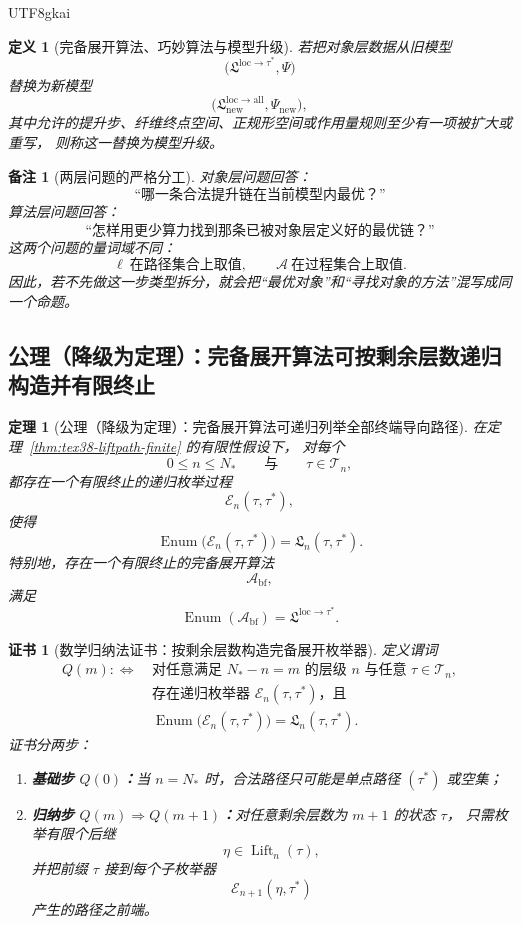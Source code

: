 \documentclass[12pt]{article}
\newtheorem{definition}{定义}[section]
\newtheorem{theorem}{定理}[section]
\newtheorem{remark}{备注}[section]
\newtheorem{Certificate}{证书}[section]
\newcommand{\Lift}{\operatorname{Lift}}
\begin{document}
\begin{CJK*}{UTF8}{gkai}
\begin{definition}[完备展开算法、巧妙算法与模型升级]
若把对象层数据从旧模型
\[
  \bigl(\mathfrak L^{\mathrm{loc}\to\tau^\ast},\Psi\bigr)
\]
替换为新模型
\[
  \bigl(\mathfrak L_{\mathrm{new}}^{\mathrm{loc}\to\mathrm{all}},\Psi_{\mathrm{new}}\bigr),
\]
其中允许的提升步、纤维终点空间、正规形空间或作用量规则至少有一项被扩大或重写，
则称这一替换为\emph{模型升级}。
\end{definition}

\begin{remark}[两层问题的严格分工]
对象层问题回答：
\[
  \text{“哪一条合法提升链在当前模型内最优？”}
\]
算法层问题回答：
\[
  \text{“怎样用更少算力找到那条已被对象层定义好的最优链？”}
\]
这两个问题的量词域不同：
\[
  \ell\ \text{在路径集合上取值},
  \qquad
  \mathcal A\ \text{在过程集合上取值}.
\]
因此，若不先做这一步类型拆分，就会把“最优对象”和“寻找对象的方法”混写成同一个命题。
\end{remark}

\subsection{公理（降级为定理）：完备展开算法可按剩余层数递归构造并有限终止}
\label{subsec:tex38-smart-enumeration}

\begin{theorem}[公理（降级为定理）：完备展开算法可递归列举全部终端导向路径]
\label{thm:tex38-smart-enumeration}
在定理~\ref{thm:tex38-liftpath-finite} 的有限性假设下，
对每个
\[
  0\le n\le N_\ast
  \qquad\text{与}\qquad
  \tau\in\mathcal T_n,
\]
都存在一个有限终止的递归枚举过程
\[
  \mathcal E_n(\tau,\tau^\ast),
\]
使得
\[
  \operatorname{Enum}\bigl(\mathcal E_n(\tau,\tau^\ast)\bigr)
  =
  \mathfrak L_n(\tau,\tau^\ast).
\]
特别地，存在一个有限终止的完备展开算法
\[
  \mathcal A_{\mathrm{bf}},
\]
满足
\[
  \operatorname{Enum}(\mathcal A_{\mathrm{bf}})
  =
  \mathfrak L^{\mathrm{loc}\to\tau^\ast}.
\]
\end{theorem}

\begin{Certificate}[数学归纳法证书：按剩余层数构造完备展开枚举器]
\label{cert:tex38-smart-enumeration}
定义谓词
\[
  \begin{aligned}
    Q(m)
    :
    \Longleftrightarrow\
    &\text{对任意满足 }N_\ast-n=m\text{ 的层级 }n\text{ 与任意 }\tau\in\mathcal T_n,\\
    &\text{存在递归枚举器 }\mathcal E_n(\tau,\tau^\ast)\text{，且}\\
    &\operatorname{Enum}\bigl(\mathcal E_n(\tau,\tau^\ast)\bigr)
    =
    \mathfrak L_n(\tau,\tau^\ast).
  \end{aligned}
\]
证书分两步：
\begin{enumerate}
  \item \textbf{基础步 $Q(0)$：}当 $n=N_\ast$ 时，合法路径只可能是单点路径 $(\tau^\ast)$ 或空集；
  \item \textbf{归纳步 $Q(m)\Rightarrow Q(m+1)$：}对任意剩余层数为 $m+1$ 的状态 $\tau$，
  只需枚举有限个后继
  \[
    \eta\in\Lift_n(\tau),
  \]
  并把前缀 $\tau$ 接到每个子枚举器
  \[
    \mathcal E_{n+1}(\eta,\tau^\ast)
  \]
  产生的路径之前端。
\end{enumerate}
\end{Certificate}


\end{CJK*}
\end{document}
